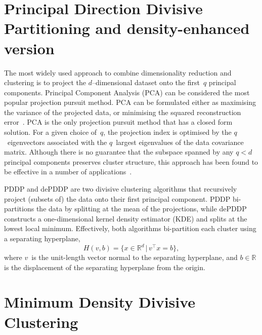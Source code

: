 \documentclass{book}
\def\R{\mathbb{R}}
\begin{document}
\section{Principal Direction Divisive Partitioning and density-enhanced version}

The most widely used approach to combine dimensionality reduction and
clustering is to project the $d$--dimensional dataset onto the first~$q$ principal components. 
%
Principal Component Analysis (PCA) can be considered the most popular projection
pursuit method. PCA can be formulated either as maximising the variance of the
projected data, or minimising the squared reconstruction
error~\cite{Jolliffe1986}. PCA is the only projection pursuit method that has
a closed form solution. For a given choice of~$q$, the projection index is
optimised by the $q$~eigenvectors associated with the $q$~largest eigenvalues
of the data covariance matrix.
%
Although there is no guarantee that the subspace spanned by any $q<d$
principal components preserves cluster structure, this approach has been found
to be effective in a number of applications~\cite{KriegelKZ2009}.

PDDP and dePDDP are two divisive clustering algorithms that recursively
project (subsets of) the data onto their first principal component.
PDDP bi-partitions the data by splitting at the mean of the projections, while
dePDDP constructs a one-dimensional kernel density estimator (KDE) and splits
at the lowest local minimum.
%
Effectively, both algorithms bi-partition each cluster 
using a separating hyperplane,
\[
H(v,b) = \{x \in \R^d \,|\, v^\top x= b\},
\]
where $v$~is the unit-length
vector normal to the separating hyperplane,
and $b \in \R$ is the displacement of the separating hyperplane from the origin.


\section{Minimum Density Divisive Clustering}
\end{document}
